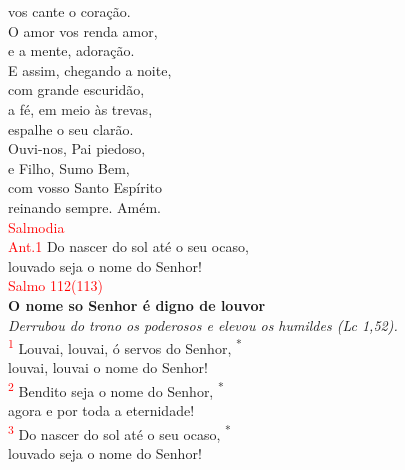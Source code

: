 \documentclass{book}
\begin{document}
\begin{center}
    vos cante o coração. \\
    O amor vos renda amor, \\
    e a mente, adoração.
    \vspace{.2cm} \\
    E assim, chegando a noite, \\
    com grande escuridão, \\
    a fé, em meio às trevas, \\
    espalhe o seu clarão.
    \vspace{.2cm} \\
    Ouvi-nos, Pai piedoso, \\
    e Filho, Sumo Bem, \\
    com vosso Santo Espírito \\
    reinando sempre. Amém.
    \vspace{.2cm} \\
    \textcolor{red}{Salmodia}
    \vspace{.2cm} \\
    \textcolor{red}{Ant.1} Do nascer do sol até o seu ocaso, \\
    louvado seja o nome do Senhor!
    \vspace{.2cm} \\
    \textcolor{red}{Salmo 112(113)}
    \vspace{.2cm} \\
    \textbf{O nome so Senhor é digno de louvor} \\
    \textit{Derrubou do trono os poderosos e elevou os humildes (Lc 1,52).}
    \vspace{.2cm} \\
    \textsuperscript{\underline{\hspace{.07in}}\textcolor{red}{1}} Louvai, louvai, ó servos do Senhor, \textsuperscript{*} \\
    louvai, louvai o nome do Senhor! \\
    \textsuperscript{\underline{\hspace{.07in}}\textcolor{red}{2}} Bendito seja o nome do Senhor, \textsuperscript{*} \\
    agora e por toda a eternidade! \\
    \textsuperscript{\underline{\hspace{.07in}}\textcolor{red}{3}} Do nascer do sol até o seu ocaso, \textsuperscript{*} \\
    louvado seja o nome do Senhor!
    \vspace{.2cm} \\

\end{center}
\end{document}
